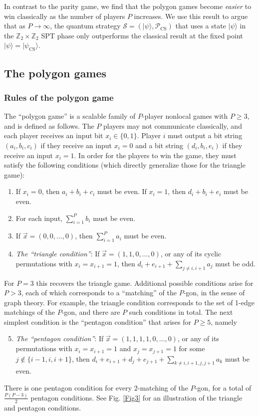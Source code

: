 \documentclass[prb,twocolumn,showpacs,amssymb,superscriptaddress]{revtex4-2}
\begin{document}
In contrast to the parity game\cite{brassard2005recasting}, we find that the polygon games become \emph{easier} to win classically as the number of players $P$ increases. We use this result to argue that as $P \to \infty$, the quantum strategy $\mathcal{S} = (|\psi\rangle, \mathcal{P}_{\mathrm{CS}})$ that uses a state $|\psi\rangle$ in the $\mathbb{Z}_2 \times \mathbb{Z}_2$ SPT phase only outperforms the classical result at the fixed point $|\psi\rangle = |\psi_{\mathrm{CS}}\rangle$.

\subsection{The polygon games}
\subsubsection{Rules of the polygon game}
The ``polygon game'' is a scalable family of $P$-player nonlocal games with $P \geq 3$, and is defined as follows. The $P$ players may not communicate classically, and each player receives an input bit $x_i \in \{0,1\}$. Player $i$ must output a bit string $(a_i,b_i,c_i)$ if they receive an input $x_i=0$ and a bit string $(d_i,b_i,e_i)$ if they receive an input $x_i=1$. In order for the players to win the game, they must satisfy the following conditions (which directly generalize those for the triangle game):
\begin{enumerate}
    \item If $x_i=0$, then $a_i+b_i+c_i$ must be even. If $x_i=1$, then $d_i + b_i + e_i$ must be even.
    \item For each input, $\sum_{i=1}^P b_i$ must be even. 
    \item If $\vec{x} = (0,0,\ldots,0)$, then $\sum_{i=1}^P a_i$ must be even.
    \item \emph{The ``triangle condition''}: If $\vec{x} = (1,1,0,\ldots,0)$, or any of its cyclic permutations with $x_i=x_{i+1}=1$, then $d_i+e_{i+1} + \sum_{j\neq i,i+1} a_j$ must be odd.
\end{enumerate}
For $P=3$ this recovers the triangle game\cite{Bravyi,DanielMiyake}. Additional possible conditions arise for $P>3$, each of which corresponds to a ``matching'' of the $P$-gon, in the sense of graph theory\cite{diestel2010graph}. For example, the triangle condition corresponds to the set of 1-edge matchings of the $P$-gon, and there are $P$ such conditions in total. The next simplest condition is the ``pentagon condition'' that arises for $P \geq 5$, namely
\begin{enumerate}
\setcounter{enumi}{4}
    \item \emph{The ``pentagon condition''}: If $\vec{x} = (1,1,1,1,0,\ldots,0)$, or any of its permutations with $x_i=x_{i+1}=1$ and $x_{j}=x_{j+1}=1$ for some $j \notin \{i-1,i,i+1\}$, then $d_i+e_{i+1} + d_j + e_{j+1} + \sum_{k\neq i,i+1,j,j+1} a_k$ must be even.
\end{enumerate}
There is one pentagon condition for every $2$-matching of the $P$-gon, for a total of $\frac{P (P-3)}{2}$ pentagon conditions. See Fig. \ref{Fig3} for an illustration of the triangle and pentagon conditions.
\end{document}
